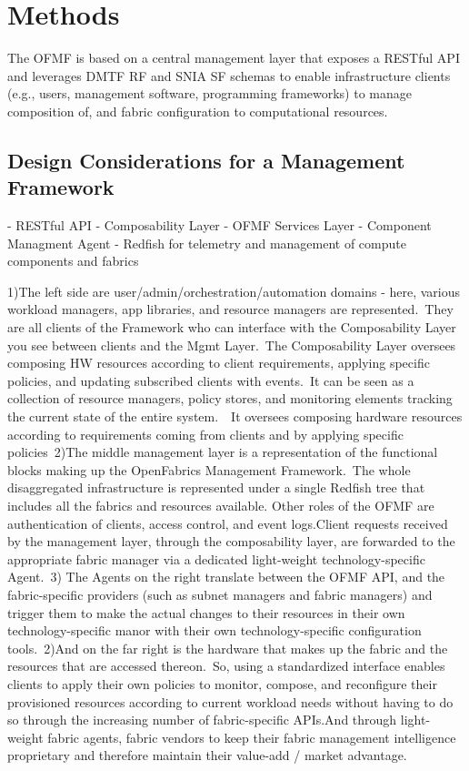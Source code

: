\section{Methods}

The OFMF is based on a central management layer that exposes a RESTful API and leverages DMTF RF and SNIA SF schemas to enable infrastructure clients (e.g., users, management software, programming frameworks) to manage composition of, and fabric configuration to computational resources. 

\subsection{Design Considerations for a Management Framework}

- RESTful API
- Composability Layer
- OFMF Services Layer
- Component Managment Agent
- Redfish for telemetry and management of compute components and fabrics


1)The left side are user/admin/orchestration/automation domains - here, various workload managers, app libraries, and resource managers are represented. They are all clients of the Framework who can interface with the Composability Layer you see between clients and the Mgmt Layer. The Composability Layer oversees composing HW resources according to client requirements, applying specific policies, and updating subscribed clients with events. It can be seen as a collection of resource managers, policy stores, and monitoring elements tracking the current state of the entire system.  It oversees composing hardware resources according to requirements coming from clients and by applying specific policies 2)The middle management layer is a representation of the functional blocks making up the OpenFabrics Management Framework. The whole disaggregated infrastructure is represented under a single Redfish tree that includes all the fabrics and resources available. Other roles of the OFMF are authentication of clients, access control, and event logs.Client requests received by the management layer, through the composability layer, are forwarded to the appropriate fabric manager via a dedicated light-weight technology-specific Agent. 3) The Agents on the right translate between the OFMF API, and the fabric-specific providers (such as subnet managers and fabric managers) and trigger them to make the actual changes to their resources in their own technology-specific manor with their own technology-specific configuration tools. 2)And on the far right is the hardware that makes up the fabric and the resources that are accessed thereon. So, using a standardized interface enables clients to apply their own policies to monitor, compose, and reconfigure their provisioned resources according to current workload needs without having to do so through the increasing number of fabric-specific APIs.And through light-weight fabric agents, fabric vendors to keep their fabric management intelligence proprietary and therefore maintain their value-add / market advantage.

